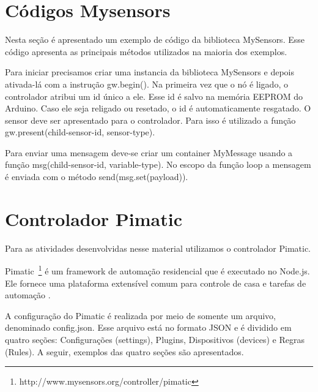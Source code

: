 \section{Códigos Mysensors}

Nesta seção é apresentado um exemplo de código da biblioteca MySensors. Esse código apresenta as principais métodos utilizados na maioria dos exemplos. 




Para iniciar precisamos criar uma instancia da biblioteca MySensors e depois ativada-lá com a instrução gw.begin(). Na primeira vez que o nó é ligado, o controlador atribui um id único a ele. Esse id é salvo na memória EEPROM do Arduino. Caso ele seja religado ou resetado, o id é automaticamente resgatado. O sensor deve ser apresentado para o controlador. Para isso é utilizado a função gw.present(child-sensor-id, sensor-type).

Para enviar uma mensagem deve-se criar um container MyMessage usando a função msg(child-sensor-id, variable-type). No escopo da função loop a mensagem é enviada com o método send(msg.set(payload)).

\section{Controlador Pimatic}

Para as atividades desenvolvidas nesse material utilizamos o 
controlador Pimatic. 

Pimatic~\footnote{http://www.mysensors.org/controller/pimatic} é um framework de automação residencial que é executado no Node.js. Ele fornece uma plataforma extensível comum para controle de casa e tarefas de automação
\cite{pimatic}.

A configuração do Pimatic é realizada por meio de somente um arquivo, denominado config.json. Esse arquivo está no formato JSON e é dividido em quatro seções: Configurações (settings), Plugins, Dispositivos (devices) e Regras (Rules). A seguir, exemplos das quatro seções são apresentados.

